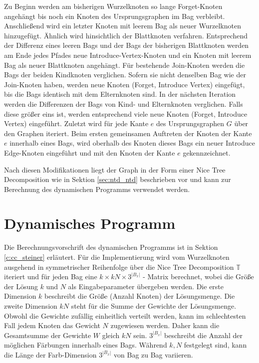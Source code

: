 Zu Beginn werden am bisherigen Wurzelknoten so lange \glqq Forget\grqq -Knoten angehängt bis noch ein Knoten des Ursprungsgraphen im Bag verbleibt. 
Anschließend wird ein letzter Knoten mit leerem Bag als neuer Wurzelknoten hinzugefügt. 
Ähnlich wird hinsichtlich der Blattknoten verfahren. 
Entsprechend der Differenz eines leeren Bags und der Bags der bisherigen Blattknoten werden am Ende jedes Pfades neue \glqq Introduce-Vertex\grqq -Knoten und ein Knoten mit leerem Bag als neuer Blattknoten angehängt. 
Für bestehende \glqq Join\grqq -Knoten werden die Bags der beiden Kindknoten verglichen. 
Sofern sie nicht denselben Bag wie der \glqq Join\grqq -Knoten haben, werden neue Knoten (\glqq Forget\grqq , \glqq Introduce Vertex\grqq ) eingefügt, bis die Bags identisch mit dem Elternknoten sind. 
In der nächsten Iteration werden die Differenzen der Bags von Kind- und Elternknoten verglichen. 
Falls diese größer eins ist, werden entsprechend viele neue Knoten (\glqq Forget\grqq , \glqq Introduce Vertex\grqq ) eingeführt.
Zuletzt wird für jede Kante $e$ des Ursprungsgraphen $G$ über den Graphen iteriert. 
Beim ersten gemeinsamen Auftreten der Knoten der Kante $e$ innerhalb eines Bags, wird oberhalb des Knoten dieses Bags ein neuer \glqq Introduce Edge\grqq -Knoten eingeführt und mit den Knoten der Kante $e$ gekennzeichnet.

Nach diesen Modifikationen liegt der Graph in der Form einer Nice Tree Decomposition wie in Sektion \ref{sec:ntd_ntd} beschrieben vor und kann zur Berechnung des dynamischen Programms verwendet werden.

\section{Dynamisches Programm}
\label{sec:impl_dynP}
Die Berechnungsvorschrift des dynamischen Programms ist in Sektion \ref{c:cc_steiner} erläutert. 
Für die Implementierung wird vom Wurzelknoten ausgehend in symmetrischer Reihenfolge über die Nice Tree Decomposition $\mathbb{T}$ iteriert und für jeden Bag eine $k \times kN \times 3^{|B_x|}$ - Matrix berechnet, wobei die Größe der Lösung $k$ und $N$ als Eingabeparameter übergeben werden. 
Die erste Dimension $k$ beschreibt die Größe (Anzahl Knoten) der Lösungsmenge. 
Die zweite Dimension $kN$ steht für die Summe der Gewichte der Lösungsmenge. 
Obwohl die Gewichte zufällig einheitlich verteilt werden, kann im schlechtesten Fall jedem Knoten das Gewicht $N$ zugewiesen werden. 
Daher kann die Gesamtsumme der Gewichte $W$ gleich $kN$ sein.
$3^{|B_x|}$ beschreibt die Anzahl der möglichen Färbungen innerhalb eines Bags. 
Während $k,N$ festgelegt sind, kann die Länge der Farb-Dimension $3^{|B_x|}$ von Bag zu Bag variieren. 
